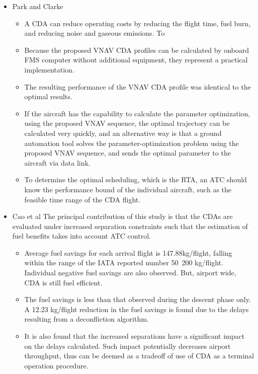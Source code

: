 \documentclass{aer1315-pretty}
\begin{document}
\begin{itemize}

\item Park and Clarke \cite{Park:2015} 
\begin{itemize}
\item A CDA can reduce operating costs by reducing the flight time, fuel burn, and reducing noise and gaseous emissions. To
\item Because the proposed VNAV CDA profiles can be calculated by onboard FMS computer without additional equipment, they represent a practical implementation. 
\item The resulting performance of the VNAV CDA profile was identical to the optimal results. 
\item If the aircraft has the capability to calculate the parameter optimization, using the proposed VNAV sequence, the optimal trajectory can be calculated very quickly, and an alternative way is that a ground automation tool solves the parameter-optimization problem using the proposed VNAV sequence, and sends the optimal parameter to the
aircraft via data link. 
\item  To determine the optimal scheduling, which is the RTA, an ATC should know the performance bound of the individual aircraft, such as the feasible time range of the CDA flight. 
\end{itemize}

\item Cao et al \cite{Cao:2013}
The principal contribution of this study is that the CDAs are evaluated under increased separation constraints such that the estimation of fuel benefits takes into account ATC control.
\begin{itemize}
\item Average fuel savings for each arrival flight is 147.88kg/flight, falling within the range of the IATA reported number 50~200 kg/flight. Individual
negative fuel savings are also observed. But, airport wide, CDA is still fuel efficient. 
\item The fuel savings is less than that observed during the descent phase only. A 12.23 kg/flight reduction in the fuel savings is found due to the delays resulting from a deconfliction algorithm. 
\item It is also found that the increased separations have a significant impact on the delays calculated. Such impact potentially decreases airport throughput, thus can be deemed as a tradeoff of use of CDA as a terminal operation procedure.
\end{itemize}



\end{itemize}
\end{document}
